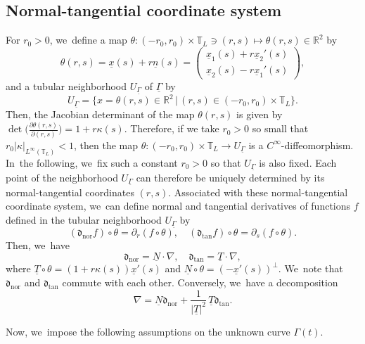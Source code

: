 \documentclass[JEP,XML,SOM,Unicode,NoFloatCountersInSection,published]{cedram}
\newcommand{\dtan}{{\mathfrak d}_\mathrm{tan}}
\newcommand{\dnor}{{\mathfrak d}_\mathrm{nor}}
\newcommand{\R}{{\mathbb R}}
\newcommand{\ul}[1]{\underline{#1}}
\newcommand{\itGamma}{\mathit{\Gamma}}
\theoremstyle{definition}
\begin{document}
\subsection{Normal-tangential coordinate system}\label{subsect:NTCS}
For $r_0>0$, we~define a map $\theta: (-r_0,r_0)\times\mathbb{T}_L\ni(r,s) \mapsto \theta(r,s)\in\R^2$ by
\begin{equation}\label{diffeo-theta}
\theta(r,s) = \ul{x}(s) + r\ul{n}(s) =
\begin{pmatrix}
\ul{x}_1(s) + r\ul{x}_2'(s) \\
\ul{x}_2(s) - r\ul{x}_1'(s)
\end{pmatrix},
\end{equation}
and a tubular neighborhood $U_{\ul{\itGamma}}$ of $\ul{\itGamma}$ by
\[
U_{\ul{\itGamma}} = \bigl\{ x=\theta(r,s)\in\R^2 \,|\, (r,s)\in (-r_0,r_0)\times\mathbb{T}_L \bigr\}.
\]
Then, the Jacobian determinant of the map $\theta(r,s)$ is given by $\det\bigl(\frac{\partial\theta(r,s)}{\partial(r,s)} \bigr) = 1+r\kappa(s)$.
Therefore, if we take $r_0>0$ so small that $r_0 |\kappa|_{L^\infty(\mathbb{T}_L)}<1$,
then the map \hbox{$\theta: (-r_0,r_0)\times\mathbb{T}_L \to U_{\ul{\itGamma}}$} is a $C^\infty$-diffeomorphism. In~the following, we~fix such a constant $r_0>0$ so that $U_{\ul{\itGamma}}$ is also fixed.
Each point of the neighborhood $U_{\ul{\itGamma}}$ can therefore be uniquely determined by its normal-tangential coordinates $(r, s)$.
Associated with these normal-tangential coordinate system, we~can define normal and tangential derivatives of functions $f$ defined in the tubular neighborhood $U_{\ul{\itGamma}}$ by
\begin{equation}\label{NorTanD}
(\dnor f)\circ\theta = \partial_r(f\circ\theta), \quad
(\dtan f)\circ\theta = \partial_s(f\circ\theta).
\end{equation}
Then, we~have
\begin{equation}\label{NorTanD2}
\dnor = \ul{N}\cdot\nabla,\quad
\dtan = \ul{T}\cdot\nabla,
\end{equation}
where $\ul{T}\circ\theta = (1+r\kappa(s))\ul{x}'(s)$ and $\ul{N}\circ\theta = (-\ul{x}'(s))^\perp$. We~note that $\dnor$ and $\dtan$ commute with each other.
Conversely, we~have a decomposition
\begin{equation}\label{diff deco}
\nabla = \ul{N}\dnor + \frac{1}{|\ul{T}|^2}\,{\ul{T}}\dtan.
\end{equation}

Now, we~impose the following assumptions on the unknown curve $\itGamma(t)$.
\end{document}
